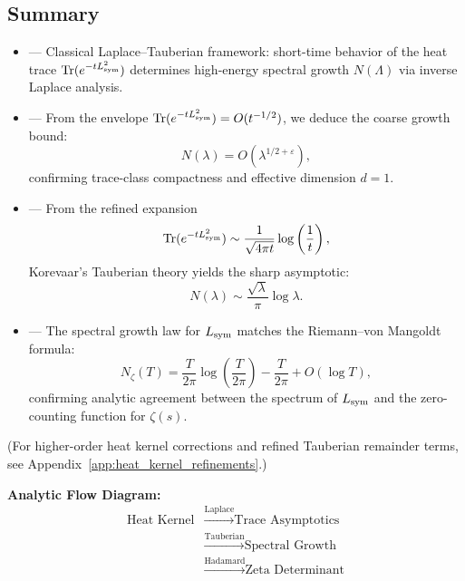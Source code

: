 \subsection*{Summary}

\begin{itemize}
  \item {} — Classical Laplace–Tauberian framework: short-time behavior of the heat trace \( \operatorname{Tr}(e^{-tL_{\mathrm{sym}}^2}) \) determines high-energy spectral growth \( N(\Lambda) \) via inverse Laplace analysis.

  \item {} — From the envelope \( \operatorname{Tr}(e^{-t L_{\mathrm{sym}}^2}) = O(t^{-1/2}) \), we deduce the coarse growth bound:
  \[
  N(\lambda) = O(\lambda^{1/2+\varepsilon}),
  \]
  confirming trace-class compactness and effective dimension \( d = 1 \).

  \item {} — From the refined expansion
  \[
  \operatorname{Tr}(e^{-t L_{\mathrm{sym}}^2}) \sim \frac{1}{\sqrt{4\pi t}} \log\left( \frac{1}{t} \right),
  \]
  Korevaar’s Tauberian theory yields the sharp asymptotic:
  \[
  N(\lambda) \sim \frac{\sqrt{\lambda}}{\pi} \log \lambda.
  \]

  \item {} — The spectral growth law for \( L_{\mathrm{sym}} \) matches the Riemann–von Mangoldt formula:
  \[
  N_\zeta(T) = \frac{T}{2\pi} \log\left( \frac{T}{2\pi} \right) - \frac{T}{2\pi} + O(\log T),
  \]
  confirming analytic agreement between the spectrum of \( L_{\mathrm{sym}} \) and the zero-counting function for \( \zeta(s) \).
\end{itemize}

\medskip
\noindent
(For higher-order heat kernel corrections and refined Tauberian remainder terms, see Appendix~\ref{app:heat_kernel_refinements}.)

\vspace{0.5em}

\noindent\textbf{Analytic Flow Diagram:}
\[
\begin{aligned}
\text{Heat Kernel}
&\xrightarrow{\text{Laplace}} \text{Trace Asymptotics} \\
&\xrightarrow{\text{Tauberian}} \text{Spectral Growth} \\
&\xrightarrow{\text{Hadamard}} \text{Zeta Determinant}
\end{aligned}
\]

